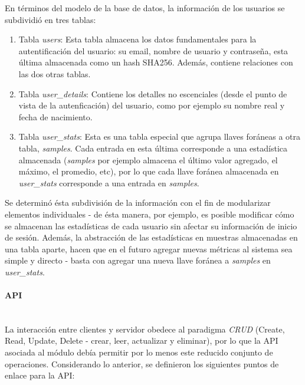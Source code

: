 \documentclass[11pt,letterpaper]{article}
\begin{document}
En términos del modelo de la base de datos, la información de los usuarios se subdividió en tres tablas:
\begin{enumerate}
    \item Tabla \emph{users}: Esta tabla almacena los datos fundamentales para la autentificación del usuario: su email, nombre de usuario y contraseña, esta última almacenada como un hash SHA256. Además, contiene relaciones con las dos otras tablas.
    \item Tabla \emph{user\_details}: Contiene los detalles no escenciales (desde el punto de vista de la autenficación) del usuario, como por ejemplo su nombre real y fecha de nacimiento.
    \item Tabla \emph{user\_stats}: Esta es una tabla especial que agrupa llaves foráneas a otra tabla, \emph{samples}. Cada entrada en esta última corresponde a una estadística almacenada (\emph{samples} por ejemplo almacena el último valor agregado, el máximo, el promedio, etc), por lo que cada llave foránea almacenada en \emph{user\_stats} corresponde a una entrada en \emph{samples}.
\end{enumerate}

Se determinó ésta subdivisión de la información con el fin de modularizar elementos individuales - de ésta manera, por ejemplo, es posible modificar cómo se almacenan las estadísticas de cada usuario sin afectar su información de inicio de sesión. Además, la abstracción de las estadísticas en muestras almacenadas en una tabla aparte, hacen que en el futuro agregar nuevas métricas al sistema sea simple y directo - basta con agregar una nueva llave foránea a \emph{samples} en \emph{user\_stats}.

\paragraph{API\\\\}

La interacción entre clientes y servidor obedece al paradigma \emph{CRUD} (Create, Read, Update, Delete - crear, leer, actualizar y eliminar), por lo que la API asociada al módulo debía permitir por lo menos este reducido conjunto de operaciones. Considerando lo anterior, se definieron los siguientes puntos de enlace para la API:
\end{document}
